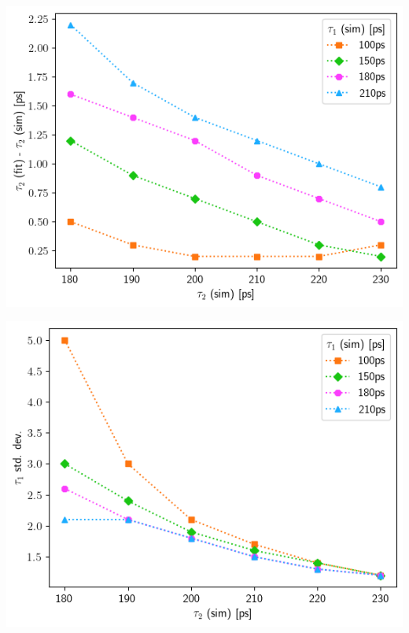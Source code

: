 {\begin{minipage}{ .47\linewidth}
    \includegraphics[width=\linewidth]{Batch 3/single Gaussian IRF/t2-diff 2080.png}
    \label{fig:compirf-t2-2080}
\end{minipage}
\hfill
\begin{minipage}{ .47\linewidth}
    \includegraphics[width=\linewidth]{Batch 3/single Gaussian IRF/t2-err 2080.png}
    \label{fig:compirf-t2err-2080}
\end{minipage}
\begin{minipage}{ .47\linewidth}

\end{minipage}}
